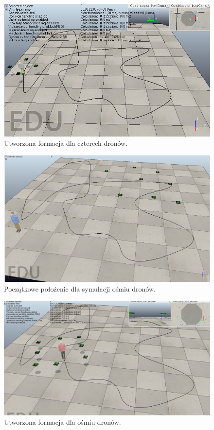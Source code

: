 \documentclass[a4paper, 11pt, oneside]{article}
\begin{document}
\begin{figure}[H]
\centering
\includegraphics[scale=0.5]{sim_4_2.png}
\caption{Utworzona formacja dla czterech dronów.}
\end{figure}

\begin{figure}[H]
\centering
\includegraphics[scale=0.25]{sim_8_1.png}
\caption{Początkowe położenie dla symulacji ośmiu dronów.}
\end{figure}

\begin{figure}[H]
\centering
\includegraphics[scale=0.25]{sim_8_2.png}
\caption{Utworzona formacja dla ośmiu dronów.}
\end{figure}
\end{document}

